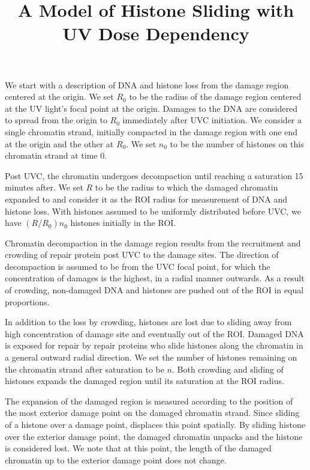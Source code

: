 \documentclass[12pt]{report}
\begin{document}
	\title{A Model of Histone Sliding with UV Dose Dependency}
	\maketitle
	We start with a description of DNA and histone loss from the damage region centered at the origin.
    We set $R_0$ to be the radius of the damage region centered at the UV light's focal point at the origin. Damages to the DNA are considered to spread from the origin to $R_0$ immediately after UVC initiation. We consider a single chromatin strand, initially compacted in the damage region with one end at the origin and the other at $R_0$. We set $n_0$ to be the number of histones on this chromatin strand at time 0.
    
    Post UVC, the chromatin undergoes decompaction until reaching a saturation 15 minutes after. We set $R$ to be the radius to which the damaged chromatin expanded to and consider it as the ROI radius for measurement of DNA and histone loss. With histones assumed to be uniformly distributed before UVC, we have $(R/R_0) n_0$ histones initially in the ROI. 
    
   Chromatin decompaction in the damage region results from the recruitment and crowding of repair protein post UVC to the damage sites. The direction of decompaction is assumed to be from the UVC focal point, for which the concentration of damages is the highest, in a radial manner outwards. As a result of crowding, non-damaged DNA and histones are pushed out of the ROI in equal proportions. 
   
   In addition to the loss by crowding, histones are lost due to sliding away from high concentration of damage site and eventually out of the ROI. Damaged DNA is exposed for repair by repair proteins who slide histones along the chromatin in a general outward radial direction. We set the number of histones remaining on the chromatin strand after saturation to be $n$. Both crowding and sliding of histones expands the damaged region until its saturation at the ROI radius. 
   
   The expansion of the damaged region is measured according to the position of the most exterior damage point on the damaged chromatin strand. Since sliding of a histone over a damage point, displaces this point spatially. 
   By sliding histone over the exterior damage point, the damaged chromatin unpacks and the histone is considered lost. We note that at this point, the length of the damaged chromatin up to the exterior damage point does not change.
        
\end{document}
